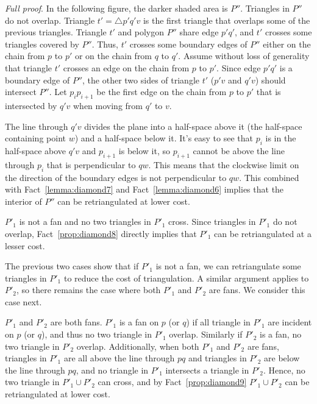 \documentclass[final]{siamltex}
\newcommand{\tri}{t}  \newcommand{\vertex}{v}
\newcommand{\Picture}[1]{}
\newcommand{\xfigpdf}[1]{\Picture{#1.pdf_t}}
\newcommand{\xfig}[1]{\xfigpdf{#1}}
\newenvironment{fullproof}{\par{\it Full proof}. \ignorespaces}{\endproof}
\begin{document}
\begin{fullproof}
In the following figure, the darker shaded area is $P''$. Triangles in $P''$ do not overlap. 
Triangle $\tri' = \triangle p' q' \vertex$ is the first triangle that overlaps some of the previous triangles.\label{case2}
Triangle $\tri'$ and polygon $P''$ share edge $p' q'$,
and $\tri'$ crosses some triangles covered by $P''$. Thus, $\tri'$ crosses some boundary 
edges of $P''$ either on the chain from $p$ to $p'$ or on the chain from $q$ to $q'$.
Assume without loss of generality that triangle $\tri'$ crosses an edge on the chain from $p$ to $p'$.
Since edge $p' q'$ is a boundary edge of $P''$, the other two sides of triangle $\tri'$ ($ p' \vertex$ and $q' \vertex$) should intersect $P''$.
Let $p_ip_{i+1}$ be the first edge on the chain from $p$ to $p'$ that is intersected by $q' \vertex$ when moving from $q'$ to $\vertex$.

\begin{center}
\scalebox{.5}
{
  \xfig{case2large}
}
\end{center}
The line through $q' \vertex$ divides the plane into a half-space above it (the half-space containing point $w$) and 
a half-space below it. It's easy to see that $p_i$ is in the half-space above $q' \vertex$ and $p_{i+1}$ is below it, 
so $p_{i+1}$ cannot be above the line through $p_i$ that is perpendicular to $q w$. This means that the clockwise 
limit on the direction of the boundary edges is not perpendicular to $q w$. 
This combined with Fact~\ref{lemma:diamond7} and Fact~\ref{lemma:diamond6} implies that the interior of $P''$ can 
be retriangulated at lower cost.



 $P'_1$ is not a fan and no two triangles in $P'_1$ cross. 
Since triangles in $P'_1$ do not overlap, Fact~\ref{prop:diamond8} directly implies that $P'_1$ can be retriangulated at a lesser cost.

The previous two cases show that if $P'_1$ is not a fan, we can retriangulate some triangles in $P'_1$ to reduce the cost of triangulation.
A similar argument applies to $P'_2$, so there remains the case where both $P'_1$ and $P'_2$ are fans. We consider this case next.



 $P'_1$ and $P'_2$ are both fans. 
$P'_1$ is a fan on $p$ (or $q$) if all triangle in $P'_1$  are incident on $p$ (or $q$), and 
thus no two triangle in $P'_1$ overlap. Similarly if $P'_2$ is a fan, no two triangle in $P'_2$
overlap. Additionally, when both $P'_1$ and $P'_2$ are fans, triangles in $P'_1$ are all above the
line through $pq$ and triangles in $P'_2$ are below the line through $pq$, and no triangle in $P'_1$
intersects a triangle in $P'_2$. Hence, no two triangle in $P'_1\cup P'_2$ can cross, and 
by Fact~\ref{prop:diamond9} $P'_1\cup P'_2$ can be retriangulated at lower cost.



\end{fullproof}
\end{document}
